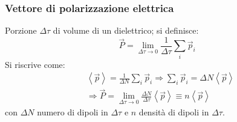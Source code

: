 \documentclass[10pt, a4paper]{scrartcl}
\numberwithin{equation}{subsection}
\theoremstyle{style1}
\begin{document}
\subsubsection{Vettore di polarizzazione elettrica}
Porzione $\Delta \tau $ di volume di un dielettrico; si definisce:
\begin{equation}
	\vec{P} = \lim_{\Delta \tau  \to 0} \frac{1}{\Delta \tau }\sum_{i}^{} \vec{p}_i
\end{equation}
Si riscrive come:
\begin{equation}
	\begin{split}
		&\left\langle \vec{p} \right\rangle = \frac{1}{\Delta N} \sum_{i}^{} \vec{p}_i \Rightarrow \sum_{i}^{} \vec{p}_i = \Delta N \left\langle \vec{p} \right\rangle\\
		&\Rightarrow \vec{P} = \lim_{\Delta \tau\to 0} \frac{\Delta N}{\Delta \tau } \left\langle \vec{p} \right\rangle\equiv n \left\langle \vec{p} \right\rangle
	\end{split}
\end{equation}
con $\Delta N$ numero di dipoli in $\Delta \tau $ e $n$ densit\`a di dipoli in $\Delta \tau $.
\end{document}
